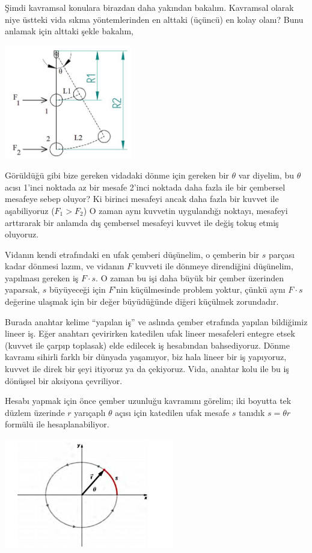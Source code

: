 \documentclass[12pt,fleqn]{article}\usepackage{../../common}
\begin{document}
Şimdi kavramsal konulara birazdan daha yakından bakalım. Kavramsal olarak niye
üstteki vida sıkma yöntemlerinden en alttaki (üçüncü) en kolay olanı? Bunu
anlamak için alttaki şekle bakalım,

\includegraphics[width=15em]{phy_005_basics_02_13.jpg}

Görüldüğü gibi bize gereken vidadaki dönme için gereken bir $\theta$ var
diyelim, bu $\theta$ acısı 1'inci noktada az bir mesafe 2'inci noktada daha
fazla ile bir çembersel mesafeye sebep oluyor? Ki birinci mesafeyi ancak daha
fazla bir kuvvet ile aşabiliyoruz ($F_1 > F_2$) O zaman aynı kuvvetin
uygulandığı noktayı, mesafeyi arttırarak bir anlamda dış çembersel mesafeyi
kuvvet ile değiş tokuş etmiş oluyoruz.

Vidanın kendi etrafındaki en ufak çemberi düşünelim, o çemberin bir $s$ parçası
kadar dönmesi lazım, ve vidanın $F$ kuvveti ile dönmeye direndiğini düşünelim,
yapılması gereken iş $F \cdot s$. O zaman bu işi daha büyük bir çember üzerinden
yaparsak, $s$ büyüyeceği için $F$'nin küçülmesinde problem yoktur, çünkü aynı $F
\cdot s$ değerine ulaşmak için bir değer büyüdüğünde diğeri küçülmek zorundadır.

Burada anahtar kelime ``yapılan iş'' ve aslında çember etrafında yapılan
bildiğimiz lineer iş. Eğer anahtarı çevirirken katedilen ufak lineer mesafeleri
entegre etsek (kuvvet ile çarpıp toplasak) elde edilecek iş hesabından
bahsediyoruz. Dönme kavramı sihirli farklı bir dünyada yaşamıyor, biz hala
lineer bir iş yapıyoruz, kuvvet ile direk bir şeyi itiyoruz ya da çekiyoruz.
Vida, anahtar kolu ile bu iş dönüşsel bir aksiyona çevriliyor. 

Hesabı yapmak için önce çember uzunluğu kavramını görelim; iki boyutta tek
düzlem üzerinde $r$ yarıçaplı $\theta$ açısı için katedilen ufak mesafe $s$
tanıdık $s = \theta r$ formülü ile hesaplanabiliyor.

\includegraphics[width=20em]{phy_005_basics_02_06.jpg}
\end{document}
